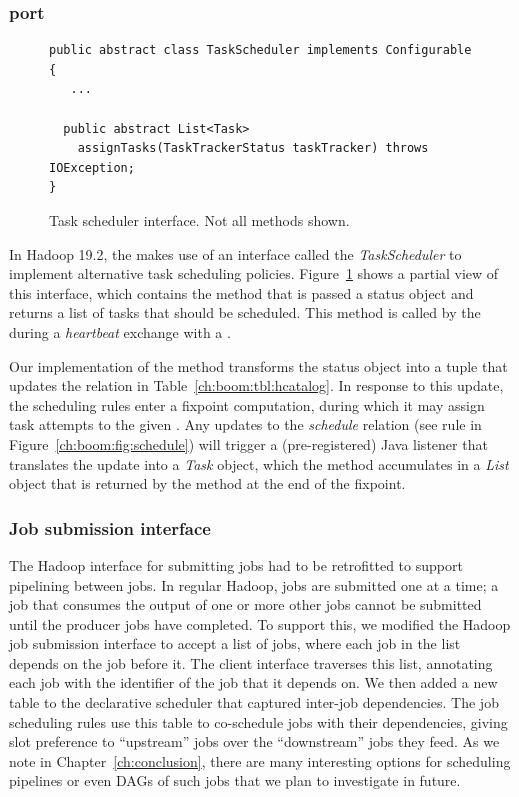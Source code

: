 \subsubsection{\JOL port}
\begin{figure}
\ssp
\begin{minipage}{\linewidth}
\centering
\begin{verbatim}
public abstract class TaskScheduler implements Configurable {
   ...
   
  public abstract List<Task> 
  	assignTasks(TaskTrackerStatus taskTracker) throws IOException;
}
\end{verbatim}
\end{minipage}
\caption{Task scheduler interface. Not all methods shown.}
\label{ch:hop:fig:taskscheduler}
\end{figure}


In Hadoop 19.2, the \JT makes use of an interface called the {\em
TaskScheduler} to implement alternative task scheduling policies.
Figure~\ref{ch:hop:fig:taskscheduler} shows a partial view of this interface,
which contains the method  that is passed a \TT status object
and returns a list of tasks that should be scheduled.  This method is called by
the \JT during a {\em heartbeat} exchange with a \TT.

Our implementation of the  method transforms the \TT status
object into a tuple that updates the  relation in
Table~\ref{ch:boom:tbl:hcatalog}.  In response to this update, the scheduling
rules enter a fixpoint computation, during which it may assign task attempts to
the given \TT.  Any updates to the {\em schedule} relation (see rule  in
Figure~\ref{ch:boom:fig:schedule}) will trigger a (pre-registered) Java
listener that translates the update into a {\em Task} object, which the
 method accumulates in a {\em List} object that is returned by
the  method at the end of the fixpoint.

\subsubsection{Job submission interface}

The Hadoop {\JT} interface for submitting jobs had to be retrofitted to support
pipelining between jobs.  In regular Hadoop, jobs are submitted one at a time;
a job that consumes the output of one or more other jobs cannot be submitted
until the producer jobs have completed.  To support this, we modified the
Hadoop job submission interface to accept a list of jobs, where each job in the
list depends on the job before it.  The client interface traverses this list,
annotating each job with the identifier of the job that it depends on.  We then
added a new table to the declarative scheduler that captured inter-job
dependencies.  The job scheduling rules use this table to co-schedule jobs with
their dependencies, giving slot preference to ``upstream'' jobs over the
``downstream'' jobs they feed.  As we note in Chapter~\ref{ch:conclusion},
there are many interesting options for scheduling pipelines or even DAGs of
such jobs that we plan to investigate in future.


